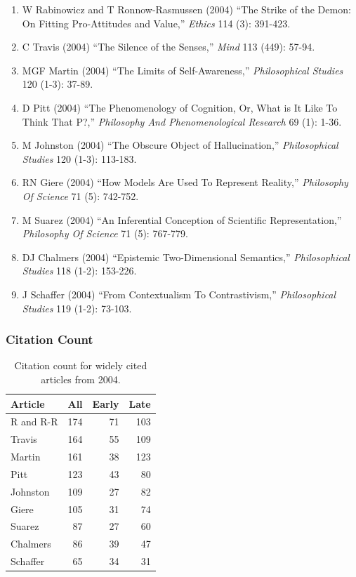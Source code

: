 \documentclass[
  10pt,
  letterpaper,
  DIV=11,
  numbers=noendperiod,
  twoside]{scrartcl}
\providecommand{\tightlist}{%
  \setlength{\itemsep}{0pt}\setlength{\parskip}{0pt}}\usepackage{longtable,booktabs,array}
\begin{document}
\begin{enumerate}
\def\labelenumi{\arabic{enumi}.}
\tightlist
\item
  W Rabinowicz and T Ronnow-Rasmussen (2004) ``The Strike of the Demon:
  On Fitting Pro-Attitudes and Value,'' \emph{Ethics} 114 (3): 391-423.
\item
  C Travis (2004) ``The Silence of the Senses,'' \emph{Mind} 113 (449):
  57-94.
\item
  MGF Martin (2004) ``The Limits of Self-Awareness,''
  \emph{Philosophical Studies} 120 (1-3): 37-89.
\item
  D Pitt (2004) ``The Phenomenology of Cognition, Or, What is It Like To
  Think That P?,'' \emph{Philosophy And Phenomenological Research} 69
  (1): 1-36.
\item
  M Johnston (2004) ``The Obscure Object of Hallucination,''
  \emph{Philosophical Studies} 120 (1-3): 113-183.
\item
  RN Giere (2004) ``How Models Are Used To Represent Reality,''
  \emph{Philosophy Of Science} 71 (5): 742-752.
\item
  M Suarez (2004) ``An Inferential Conception of Scientific
  Representation,'' \emph{Philosophy Of Science} 71 (5): 767-779.
\item
  DJ Chalmers (2004) ``Epistemic Two-Dimensional Semantics,''
  \emph{Philosophical Studies} 118 (1-2): 153-226.
\item
  J Schaffer (2004) ``From Contextualism To Contrastivism,''
  \emph{Philosophical Studies} 119 (1-2): 73-103.
\end{enumerate}

\subsubsection*{Citation Count}\label{sec-count-2004}

\begin{longtable}[]{@{}lrrr@{}}

\caption{\label{tbl-citation-count-2004}Citation count for widely cited
articles from 2004.}

\tabularnewline

\toprule\noalign{}
Article & All & Early & Late \\
\midrule\noalign{}
\endhead
\bottomrule\noalign{}
\endlastfoot
R and R-R & 174 & 71 & 103 \\
Travis & 164 & 55 & 109 \\
Martin & 161 & 38 & 123 \\
Pitt & 123 & 43 & 80 \\
Johnston & 109 & 27 & 82 \\
Giere & 105 & 31 & 74 \\
Suarez & 87 & 27 & 60 \\
Chalmers & 86 & 39 & 47 \\
Schaffer & 65 & 34 & 31 \\

\end{longtable}
\end{document}
